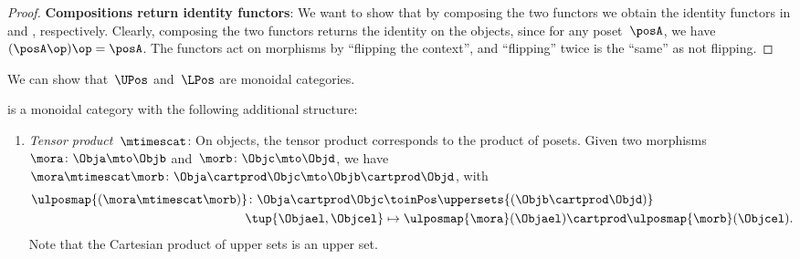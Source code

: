 \begin{proof}
    \textbf{Compositions return identity functors}:
    We want to show that by composing the two functors we obtain the identity functors in \UPos and \LPos, respectively.
    Clearly, composing the two functors returns the identity on the objects, since for any poset~$\posA$, we have~$(\posA\op)\op=\posA$.
    The functors act on morphisms by ``flipping the context'', and ``flipping'' twice is the ``same'' as not flipping.
\end{proof}

We can show that~$\UPos$ and~$\LPos$ are monoidal categories.

\begin{lemma}
    \label{lem:upos_moncat}
    \UPos is a monoidal category with the following additional structure:
    \begin{enumerate}
        \item \emph{Tensor product~$\mtimescat$}: On objects, the tensor product corresponds to the product of posets.
              Given two morphisms~$\mora\colon \Obja\mto \Objb$ and~$\morb\colon \Objc\mto \Objd$, we have~$\mora \mtimescat \morb\colon  \Obja \cartprod \Objc \mto \Objb\cartprod \Objd$, with
              \begin{equation}
                  \begin{aligned}
                      \ulposmap{(\mora\mtimescat \morb)}\colon \Obja \cartprod \Objc & \toinPos \uppersets{(\Objb\cartprod \Objd)} \\
                      \tup{\Objael,\Objcel}                                          & \mapsto \ulposmap{\mora}(\Objael)\cartprod \ulposmap{\morb}(\Objcel).
                  \end{aligned}
              \end{equation}
              Note that the Cartesian product of upper sets is an upper set.


\end{enumerate}
\end{lemma}
